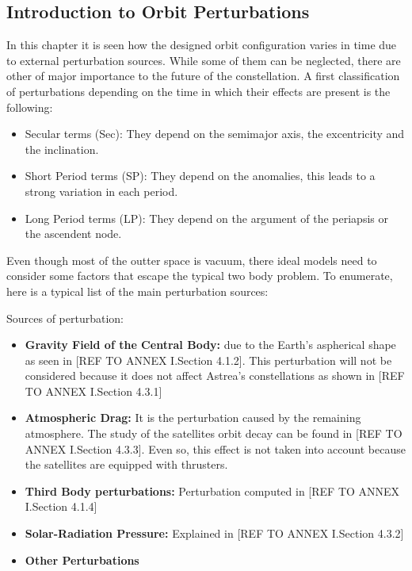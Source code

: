 \subsection{Introduction to Orbit Perturbations\cite{Vallado2007}}\label{TypesPerturb}

In this chapter it is seen how the designed orbit configuration varies in time due to external perturbation sources. While some of them can be neglected, there are other of major importance to the future of the constellation. A first classification of perturbations depending on the time in which their effects are present is the following:

\begin{itemize}
\item Secular terms (Sec): They depend on the semimajor axis, the excentricity and the inclination.
\item Short Period terms (SP): They depend on the anomalies, this leads to a strong variation in each period.
\item Long Period terms (LP): They depend on the argument of the periapsis or the ascendent node.
\end{itemize}

Even though most of the outter space is vacuum, there ideal models need to consider some factors that escape the typical two body problem. To enumerate, here is a typical list of the main perturbation sources:

Sources of perturbation:
\begin{itemize}
\item \textbf{Gravity Field of the Central Body:} due to the Earth's aspherical shape as seen in [REF TO ANNEX I.Section 4.1.2]. This perturbation will not be considered because it does not affect Astrea's constellations as shown in [REF TO ANNEX I.Section 4.3.1]
\item \textbf{Atmospheric Drag:} It is the perturbation caused by the remaining atmosphere. The study of the satellites orbit decay can be found in [REF TO ANNEX I.Section 4.3.3]. Even so, this effect is not taken into account because the satellites are equipped with thrusters.
\item \textbf{Third Body perturbations:} Perturbation computed in [REF TO ANNEX I.Section 4.1.4]
\item \textbf{Solar-Radiation Pressure:} Explained in [REF TO ANNEX I.Section 4.3.2]
\item \textbf{Other Perturbations}
\end{itemize}
